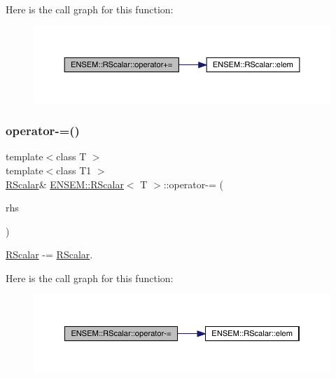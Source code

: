 Here is the call graph for this function\+:
\nopagebreak
\begin{figure}[H]
\begin{center}
\leavevmode
\includegraphics[width=350pt]{d0/d8c/classENSEM_1_1RScalar_adc6bf2610b8af0ab175ef00d9194aa1d_cgraph}
\end{center}
\end{figure}
\mbox{\label{classENSEM_1_1RScalar_a6d158db5ecf3dcc81fe905c6664cac58}} 
\subsubsection{\texorpdfstring{operator-\/=()}{operator-=()}\hspace{0.1cm}{\footnotesize\ttfamily [1/2]}}
{\footnotesize\ttfamily template$<$class T $>$ \\
template$<$class T1 $>$ \\
\mbox{\hyperlink{classENSEM_1_1RScalar}{R\+Scalar}}\& \mbox{\hyperlink{classENSEM_1_1RScalar}{E\+N\+S\+E\+M\+::\+R\+Scalar}}$<$ T $>$\+::operator-\/= (\begin{DoxyParamCaption}\item[{const \mbox{\hyperlink{classENSEM_1_1RScalar}{R\+Scalar}}$<$ T1 $>$ \&}]{rhs }\end{DoxyParamCaption})\hspace{0.3cm}{\ttfamily [inline]}}



\mbox{\hyperlink{classENSEM_1_1RScalar}{R\+Scalar}} -\/= \mbox{\hyperlink{classENSEM_1_1RScalar}{R\+Scalar}}. 

Here is the call graph for this function\+:
\nopagebreak
\begin{figure}[H]
\begin{center}
\leavevmode
\includegraphics[width=350pt]{d0/d8c/classENSEM_1_1RScalar_a6d158db5ecf3dcc81fe905c6664cac58_cgraph}
\end{center}
\end{figure}
\mbox{\label{classENSEM_1_1RScalar_a6d158db5ecf3dcc81fe905c6664cac58}} 

